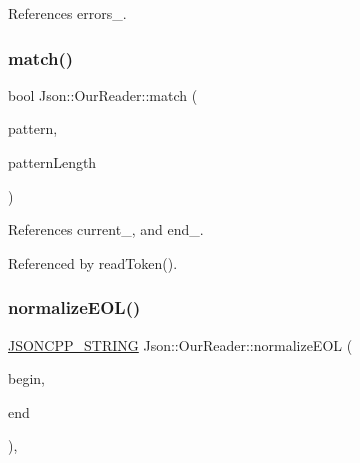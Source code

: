References errors\+\_\+.

\mbox{\label{classJson_1_1OurReader_a4a03f1b266def9b47c4fef35386557fb_a4a03f1b266def9b47c4fef35386557fb}} 
\subsubsection{\texorpdfstring{match()}{match()}}
{\footnotesize\ttfamily bool Json\+::\+Our\+Reader\+::match (\begin{DoxyParamCaption}\item[{\hyperlink{classJson_1_1OurReader_a1bdc7bbc52ba87cae6b19746f2ee0189_a1bdc7bbc52ba87cae6b19746f2ee0189}{Location}}]{pattern,  }\item[{int}]{pattern\+Length }\end{DoxyParamCaption})\hspace{0.3cm}{\ttfamily [private]}}



References current\+\_\+, and end\+\_\+.



Referenced by read\+Token().

\mbox{\label{classJson_1_1OurReader_a73ec369ee36598e008b80e36263691be_a73ec369ee36598e008b80e36263691be}} 
\subsubsection{\texorpdfstring{normalize\+E\+O\+L()}{normalizeEOL()}}
{\footnotesize\ttfamily \hyperlink{json_8h_a1e723f95759de062585bc4a8fd3fa4be_a1e723f95759de062585bc4a8fd3fa4be}{J\+S\+O\+N\+C\+P\+P\+\_\+\+S\+T\+R\+I\+NG} Json\+::\+Our\+Reader\+::normalize\+E\+OL (\begin{DoxyParamCaption}\item[{\hyperlink{classJson_1_1OurReader_a1bdc7bbc52ba87cae6b19746f2ee0189_a1bdc7bbc52ba87cae6b19746f2ee0189}{Our\+Reader\+::\+Location}}]{begin,  }\item[{\hyperlink{classJson_1_1OurReader_a1bdc7bbc52ba87cae6b19746f2ee0189_a1bdc7bbc52ba87cae6b19746f2ee0189}{Our\+Reader\+::\+Location}}]{end }\end{DoxyParamCaption})\hspace{0.3cm}{\ttfamily [static]}, {\ttfamily [private]}}



